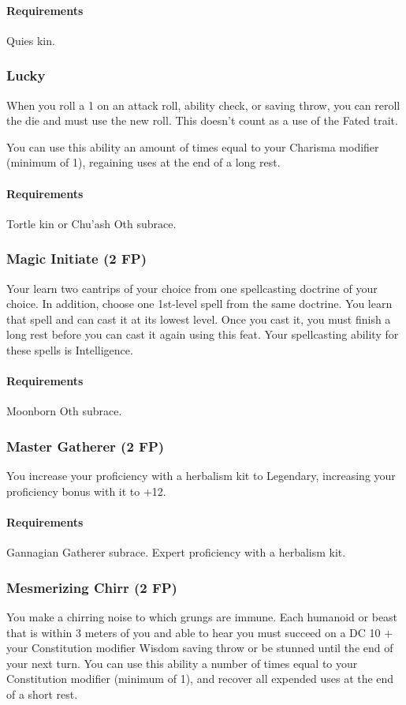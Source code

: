     \paragraph{Requirements} Quies kin.
\subsubsection{Lucky} \label{feat::lucky}
    When you roll a 1 on an attack roll, ability check, or saving throw, you can reroll the die and must use the new roll.
    This doesn't count as a use of the Fated trait.

    You can use this ability an amount of times equal to your Charisma modifier (minimum of 1), regaining uses at the end of a long rest.
    \paragraph{Requirements} Tortle kin or Chu'ash Oth subrace.
\subsubsection{Magic Initiate (2 FP)} \label{feat::magicinitiate}
    Your learn two cantrips of your choice from one spellcasting doctrine of your choice.
    In addition, choose one 1st-level spell from the same doctrine.
    You learn that spell and can cast it at its lowest level.
    Once you cast it, you must finish a long rest before you can cast it again using this feat.
    Your spellcasting ability for these spells is Intelligence.
    \paragraph{Requirements} Moonborn Oth subrace.
\subsubsection{Master Gatherer (2 FP)} \label{feat::mastergatherer}
    You increase your proficiency with a herbalism kit to Legendary, increasing your proficiency bonus with it to +12.
    \paragraph{Requirements} Gannagian Gatherer subrace. Expert proficiency with a herbalism kit.
\subsubsection{Mesmerizing Chirr (2 FP)} \label{feat::mesmerizingchirr}
    You make a chirring noise to which grungs are immune.
    Each humanoid or beast that is within 3 meters of you and able to hear you must succeed on a DC 10 + your Constitution modifier Wisdom saving throw or be stunned until the end of your next turn.
    You can use this ability a number of times equal to your Constitution modifier (minimum of 1), and recover all expended uses at the end of a short rest.
